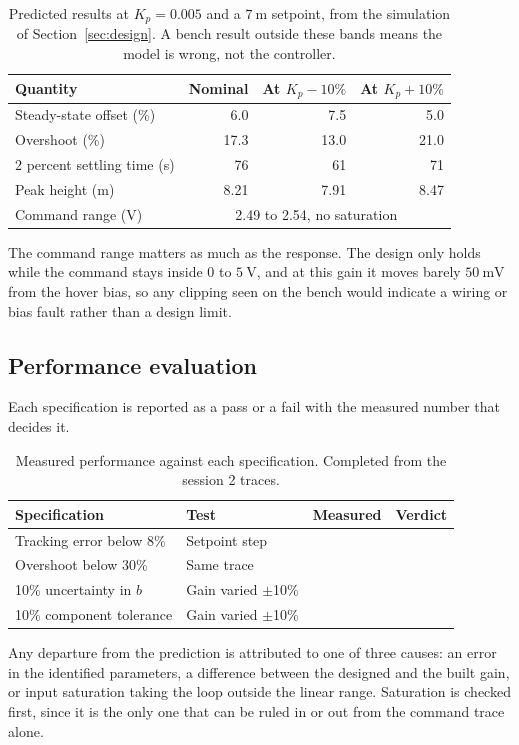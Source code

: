 \begin{table}[htbp]
\centering
\caption{Predicted results at $K_p = 0.005$ and a $7\ \mathrm{m}$ setpoint, from the simulation
of Section~\ref{sec:design}. A bench result outside these bands means the model is wrong, not the
controller.}
\label{tab:predictions}
\begin{tabular}{lrrr}
\toprule
Quantity & Nominal & At $K_p -10\%$ & At $K_p +10\%$ \\
\midrule
Steady-state offset (\%) & 6.0 & 7.5 & 5.0 \\
Overshoot (\%)           & 17.3 & 13.0 & 21.0 \\
$2$ percent settling time (s) & 76 & 61 & 71 \\
Peak height (m)          & 8.21 & 7.91 & 8.47 \\
Command range (V)        & \multicolumn{3}{c}{2.49 to 2.54, no saturation} \\
\bottomrule
\end{tabular}
\end{table}

The command range matters as much as the response. The design only holds while the command stays
inside $0$ to $5\ \mathrm{V}$, and at this gain it moves barely $50\ \mathrm{mV}$ from the hover
bias, so any clipping seen on the bench would indicate a wiring or bias fault rather than a
design limit.


\subsection{Performance evaluation}
Each specification is reported as a pass or a fail with the measured number that decides it.

\begin{table}[htbp]
\centering
\begin{tabular}{llll}
\toprule
\textbf{Specification} & \textbf{Test} & \textbf{Measured} & \textbf{Verdict} \\
\midrule
Tracking error below 8\%     & Setpoint step       & & \\
Overshoot below 30\%         & Same trace          & & \\
10\% uncertainty in $b$      & Gain varied $\pm$10\% & & \\
10\% component tolerance     & Gain varied $\pm$10\% & & \\
\bottomrule
\end{tabular}
\caption{Measured performance against each specification. Completed from the session 2 traces.}
\label{tab:spec_results}
\end{table}

Any departure from the prediction is attributed to one of three causes: an error in the identified
parameters, a difference between the designed and the built gain, or input saturation taking the
loop outside the linear range. Saturation is checked first, since it is the only one that can be
ruled in or out from the command trace alone.
